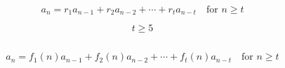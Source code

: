 \begin{frame}{}
  \[
    a_n = r_1 a_{n-1} + r_2 a_{n-2} + \cdots + r_t a_{n-t} \quad \text{for } n \ge t
  \]

  \[
    t \ge 5
  \]

  \pause
  \begin{columns}
  \end{columns}

  \pause
  \vspace{0.50cm}
  \centerline{}
\end{frame}

\begin{frame}{}
  \[
    a_n = f_1(n) a_{n-1} + f_2(n) a_{n-2} + \cdots + f_t(n) a_{n-t} \quad \text{for } n \ge t
  \]

  \pause
  \vspace{0.80cm}
  \centerline{}
\end{frame}

\begin{frame}{}
\end{frame}
